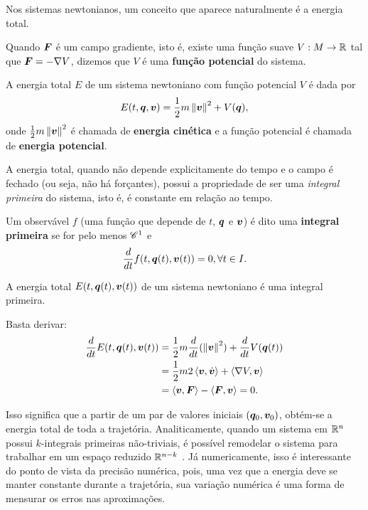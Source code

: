 Nos sistemas newtonianos, um conceito que aparece naturalmente é a energia total.

\begin{definition}
    Quando $\bm F$ é um campo gradiente, isto é, existe uma função suave $V:M \to \mathbb{R}$ tal que $\bm F = - \nabla V$, dizemos que $V$ é uma \textbf{função potencial} do sistema.
\end{definition}

\begin{definition}
    A energia total $E$ de um sistema newtoniano com função potencial $V$ é dada por
    \begin{equation}\label{eq:energia_total}
        E(t, \bm q, \bm v) = \dfrac{1}{2} m \left\Vert \bm v \right\Vert^2 + V(\bm q),
    \end{equation}
    onde $\frac{1}{2} m \left\Vert \bm v \right\Vert^2$ é chamada de \textbf{energia cinética} e a função potencial é chamada de \textbf{energia potencial}.
\end{definition}

A energia total, quando não depende explicitamente do tempo e o campo é fechado (ou seja, não há forçantes), possui a propriedade de ser uma \textit{integral primeira} do sistema, isto é, é constante em relação ao tempo.

\begin{definition}\label{def:integral_primeira}
    Um observável $f$ (uma função que depende de $t$, $\bm q$ e $\bm v$) é dito uma \textbf{integral primeira} se for pelo menos ${\mathscr{C}}^1$ e
    \begin{equation}
        \dfrac{d }{d t} f (t, \bm q(t), \bm v(t)) = 0, \forall t \in I.
    \end{equation}
\end{definition}

\begin{theorem}\label{teorema:energia_total}
    A energia total $E(t, \bm q(t), \bm v(t))$ de um sistema newtoniano é uma integral primeira.
\end{theorem}
\begin{Proof}
    Basta derivar:
    \begin{align*}
        \dfrac{d }{d t} E(t, \bm q(t), \bm v(t))
        &= \dfrac{1}{2} m \dfrac{d }{d t}(\left\Vert \bm v \right\Vert^2) + \dfrac{d }{d t} V(\bm q(t))  \\
        &= \dfrac{1}{2} m 2 \left\langle \bm v, \dot {\bm v} \right\rangle + \left\langle \nabla V, \bm v \right\rangle \\
        &= \left\langle \bm v, \bm F \right\rangle - \left\langle \bm F, \bm v \right\rangle = 0.
    \end{align*}
\end{Proof}

Isso significa que a partir de um par de valores iniciais $(\bm q_0, \bm v_0)$, obtém-se a energia total de toda a trajetória. Analiticamente, quando um sistema em $\mathbb{R}^n$ possui $k$-integrais primeiras não-triviais, é possível remodelar o sistema para trabalhar em um espaço reduzido $\mathbb{R}^{n-k}$ \citep[93-94]{de_queiroz_barros_mecanica_1995}. Já numericamente, isso é interessante do ponto de vista da precisão numérica, pois, uma vez que a energia deve se manter constante durante a trajetória, sua variação numérica é uma forma de mensurar os erros nas aproximações.